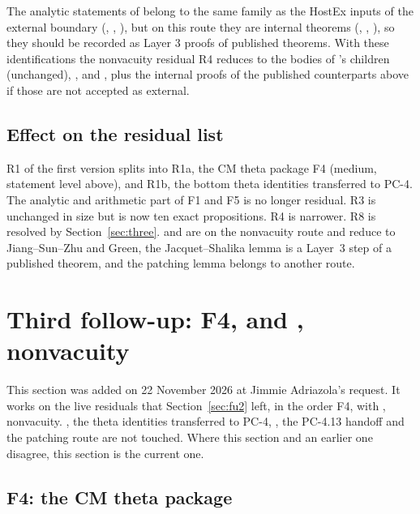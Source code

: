\documentclass[11pt]{article}
\newcommand{\PC}[1]{\textsf{PC-#1}}
\theoremstyle{remark}
\begin{document}
\noindent The analytic statements of  belong to the same family as the HostEx inputs of the external boundary (, , ), but on this route they are internal theorems (, , ), so they should be recorded as Layer 3 proofs of published theorems. With these identifications the nonvacuity residual R4 reduces to the bodies of 's children (unchanged), ,  and , plus the internal proofs of the published counterparts above if those are not accepted as external.

\subsection{Effect on the residual list}

R1 of the first version splits into R1a, the CM theta package F4 (medium, statement level above), and R1b, the bottom theta identities transferred to \PC{4}. The analytic and arithmetic part of F1 and F5 is no longer residual. R3 is unchanged in size but is now ten exact propositions. R4 is narrower. R8 is resolved by Section~\ref{sec:three}.  and  are on the nonvacuity route and reduce to Jiang--Sun--Zhu and Green, the Jacquet--Shalika lemma is a Layer~3 step of a published theorem, and the patching lemma belongs to another route.

\section{Third follow-up: F4,  and , nonvacuity}\label{sec:fu3}

This section was added on 22 November 2026 at Jimmie Adriazola's request. It works on the live residuals that Section~\ref{sec:fu2} left, in the order F4,  with , nonvacuity. , the theta identities transferred to \PC{4}, , the \PC{4}.13 handoff and the patching route are not touched. Where this section and an earlier one disagree, this section is the current one.

\subsection{F4: the CM theta package }\label{sec:fu3f4}
\end{document}
